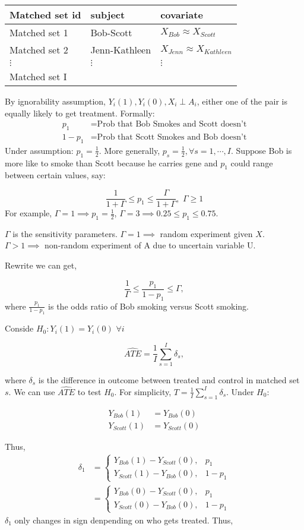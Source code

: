 \documentclass[
]{book}
\begin{document}
\begin{longtable}[]{@{}lll@{}}
\toprule
Matched set id & subject & covariate\tabularnewline
\midrule
\endhead
Matched set 1 & Bob-Scott & \(X_{Bob} \approx X_{Scott}\)\tabularnewline
Matched set 2 & Jenn-Kathleen & \(X_{Jenn} \approx X_{Kathleen}\)\tabularnewline
\(\vdots\) & \(\vdots\) & \(\vdots\)\tabularnewline
Matched set I & &\tabularnewline
\bottomrule
\end{longtable}

By ignorability assumption, \(Y_{i}(1), Y_{i}(0), X_{i} \perp A_{i}\), either one of the pair is equally likely to get treatment. Formally:
\begin{align*}
p_1 &= \text{Prob that Bob Smokes and Scott doesn't} \\
1 - p_1 &= \text{Prob that Scott Smokes and Bob doesn't}
\end{align*}
Under assumption: \(p_1 = \frac{1}{2}\). More generally, \(p_s = \frac{1}{2}, \forall s=1,\cdots,I\). Suppose Bob is more like to smoke than Scott because he carries gene and \(p_1\) could range between certain values, say:

\[\frac{1}{1+\Gamma} \leq p_1 \leq \frac{\Gamma}{1+\Gamma}, \,\, \Gamma \geq 1\]
For example, \(\Gamma=1 \implies p_1 =\frac{1}{2}\), \(\Gamma=3 \implies 0.25 \leq p_1 \leq 0.75\).

\(\Gamma\) is the sensitivity parameters. \(\Gamma = 1 \implies\) random experiment given \(X\). \(\Gamma > 1 \implies\) non-random experiment of A due to uncertain variable U.

Rewrite we can get,

\[\frac{1}{\Gamma} \leq \frac{p_1}{1-p_1} \leq \Gamma,\]
where \(\frac{p_1}{1-p_1}\) is the odds ratio of Bob smoking versus Scott smoking.

Conside \(H_0: Y_i{(1)} = Y_i{(0)}\,\,\forall i\)

\[\hat{ATE} = \frac{1}{I} \sum_{s=1}^{I} \delta_s,\]

where \(\delta_s\) is the difference in outcome between treated and control in matched set \(s\). We can use \(\hat{ATE}\) to test \(H_0\). For simplicity, \(T= \frac{1}{I} \sum_{s=1}^{I} \delta_s\). Under \(H_0\):

\begin{align*}
Y_{Bob}(1) &=  Y_{Bob}(0)\\
Y_{Scott}(1) &= Y_{Scott}(0)
\end{align*}

Thus,
\begin{align*}
\delta_1 &= 
\begin{cases}
    Y_{Bob}(1) - Y_{Scott}(0),& p_1\\
    Y_{Scott}(1) - Y_{Bob}(0),& 1 - p_1
\end{cases} \\
&= 
\begin{cases}
    Y_{Bob}(0) - Y_{Scott}(0),& p_1\\
    Y_{Scott}(0) - Y_{Bob}(0),& 1 - p_1
\end{cases}
\end{align*}
\(\delta_1\) only changes in sign denpending on who gets treated. Thus,
\end{document}

